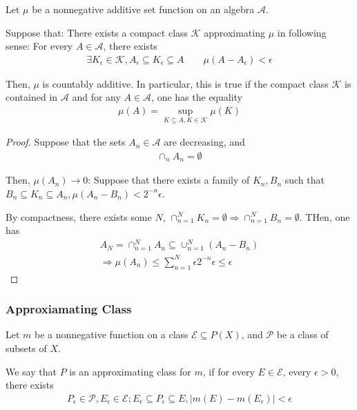 \documentclass[Total.tex]{subfiles}
\begin{document}
			\begin{proposition}
				Let $\mu$ be a nonnegative additive set function on an algebra $\mathcal{A}$. 
				
				Suppose that: There exists a compact class $\mathcal{K}$ approximating $\mu$ in following sense: For every $A\in \mathcal{A}$, there exists 
				\begin{gather*}
					\exists K_\epsilon\in \mathcal{K},A_\epsilon\subseteq K_\epsilon\subseteq A\qquad \mu(A-A_\epsilon)<\epsilon
				\end{gather*}
				
				Then, $\mu$ is countably additive. In particular, this is true if the compact class $\mathcal{K}$ is contained in $\mathcal{A}$ and for any $A\in \mathcal{A}$, one has the equality
				\begin{gather*}
					\mu(A)=\sup_{K\subseteq A,K\in \mathcal{K}} \mu(K)
				\end{gather*}
			\end{proposition}
			\begin{proof}
				Suppose that the sets $A_n\in \mathcal{A}$ are decreasing, and 
				\begin{gather*}
					\cap_n A_n=\emptyset
				\end{gather*}
				
				Then, $\mu(A_n)\rightarrow 0$: Suppose that there exists a family of $K_n,B_n$ such that $B_n\subseteq K_n\subseteq A_n,\mu(A_n-B_n)<2^{-n}\epsilon$.
				
				By compactness, there exists some $N$, $\cap_{n=1}^N K_n=\emptyset\Rightarrow \cap_{n=1}^N B_n=\emptyset$. THen, one has
				\begin{gather*}
					A_N=\cap_{n=1}^N A_n\subseteq \cup_{n=1}^N (A_n-B_n)\\
					\Rightarrow \mu(A_n)\leq \sum_{n=1}^N \epsilon 2^{-n}\epsilon\leq \epsilon
				\end{gather*}
			\end{proof}
			
			\subsubsection{Approxiamating Class}
				\begin{Def}
					Let $m$ be a nonnegative function on a class $\mathscr{E}\subseteq P(X)$, and $\mathcal{P}$ be a class of subsets of $X$. 
					
					We say that $P$ is an approximating class for $m$, if for every $E\in \mathscr{E}$, every $\epsilon>0$, there exists 
					\begin{gather*}
						P_\epsilon\in \mathcal{P},E_\epsilon\in \mathcal{E};E_\epsilon\subseteq P_\epsilon\subseteq E,|m(E)-m(E_\epsilon)|<\epsilon
					\end{gather*}
				\end{Def}
				
\end{document}
